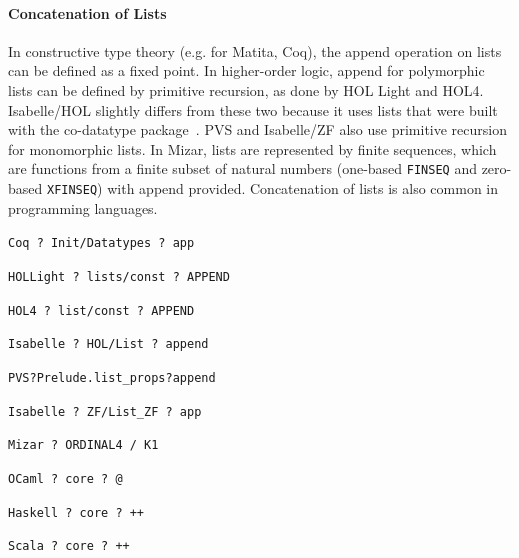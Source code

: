 \paragraph{Concatenation of Lists}

In constructive type theory (e.g. for Matita, Coq), the append operation on lists can
be defined as a fixed point.  In higher-order logic, append for polymorphic lists
can be defined by primitive recursion, as done by HOL Light and HOL4.  Isabelle/HOL
slightly differs from these two because it uses lists that were built with the co-datatype
package~\cite{BlanchetteHLP-ITP14}.
PVS and Isabelle/ZF also use primitive recursion for monomorphic lists.
In Mizar, lists are represented by finite sequences, which are functions from a finite subset of natural numbers (one-based \texttt{FINSEQ} and zero-based \texttt{XFINSEQ}) with append provided.
Concatenation of lists is also common in programming languages.

\begin{compactitem}
\item \texttt{Coq ? Init/Datatypes ? app}
\item \texttt{HOLLight ? lists/const ? APPEND}
\item \texttt{HOL4 ? list/const ? APPEND}
\item \texttt{Isabelle ? HOL/List ? append}
\item \texttt{PVS?Prelude.list\_props?append}
\item \texttt{Isabelle ? ZF/List\_ZF ? app}
\item \texttt{Mizar ? ORDINAL4 / K1} %
\item \texttt{OCaml ? core ? @ }
\item \texttt{Haskell ? core ? ++ }
\item \texttt{Scala ? core ? ++ }
\end{compactitem}








